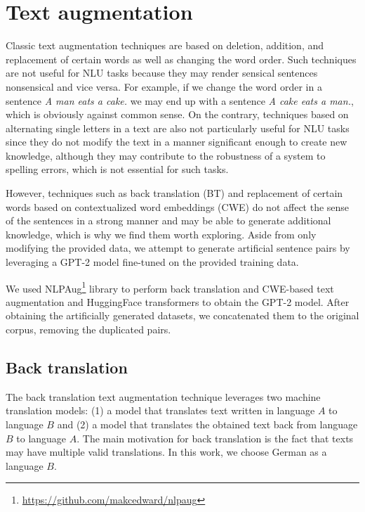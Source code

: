 \documentclass[10pt, a4paper]{article}
\begin{document}
\section{Text augmentation}
\label{aug}
Classic text augmentation techniques are based on deletion, addition, and replacement of certain words as well as changing the word order. Such techniques are not useful for NLU tasks because they may render sensical sentences nonsensical and vice versa. For example, if we change the word order in a sentence \textit{A man eats a cake.} we may end up with a sentence \textit{A cake eats a man.}, which is obviously against common sense. On the contrary, techniques based on alternating single letters in a text are also not particularly useful for NLU tasks since they do not modify the text in a manner significant enough to create new knowledge, although they may contribute to the robustness of a system to spelling errors, which is not essential for such tasks.

However, techniques such as back translation (BT) and replacement of certain words based on contextualized word embeddings (CWE) do not affect the sense of the sentences in a strong manner and may be able to generate additional knowledge, which is why we find them worth exploring. Aside from only modifying the provided data, we attempt to generate artificial sentence pairs by leveraging a GPT-2 model fine-tuned on the provided training data.

We used NLPAug\footnote{\href{https://github.com/makcedward/nlpaug}{https://github.com/makcedward/nlpaug}} library to perform back translation and CWE-based text augmentation and HuggingFace transformers to obtain the GPT-2 model. After obtaining the artificially generated datasets, we concatenated them to the original corpus, removing the duplicated pairs.


\subsection{Back translation}
The back translation text augmentation technique leverages two machine translation models: (1) a model that translates text written in language $A$ to language $B$ and (2) a model that translates the obtained text back from language $B$ to language $A$. The main motivation for back translation is the fact that texts may have multiple valid translations. In this work, we choose German as a language $B$.
\end{document}
